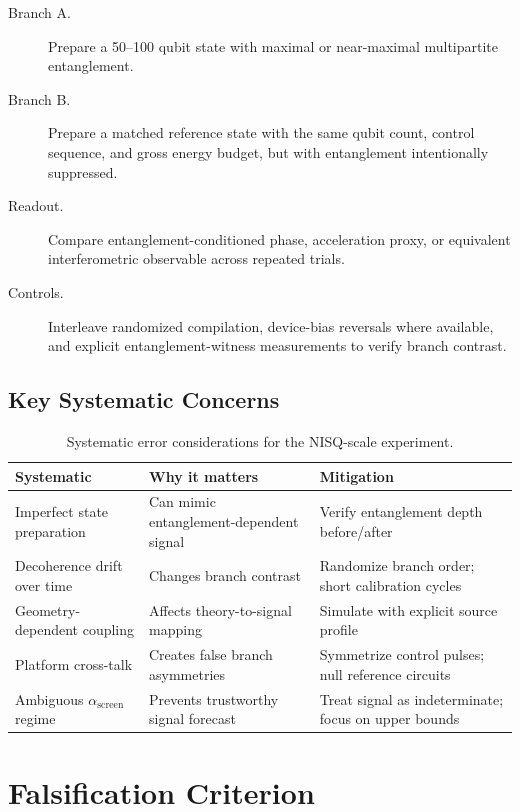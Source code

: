 \documentclass[12pt,letterpaper]{article}
\theoremstyle{plain}
\theoremstyle{definition}
\theoremstyle{remark}
\newcommand{\ascreen}{\alpha_{\mathrm{screen}}}
\begin{document}
\begin{description}
  \item[Branch A.] Prepare a 50--100 qubit state with maximal or
    near-maximal multipartite entanglement.
  \item[Branch B.] Prepare a matched reference state with the same
    qubit count, control sequence, and gross energy budget, but with
    entanglement intentionally suppressed.
  \item[Readout.] Compare entanglement-conditioned phase, acceleration
    proxy, or equivalent interferometric observable across repeated trials.
  \item[Controls.] Interleave randomized compilation, device-bias reversals
    where available, and explicit entanglement-witness measurements to verify
    branch contrast.
\end{description}

\subsection{Key Systematic Concerns}

\begin{table}[H]
\centering
\caption{Systematic error considerations for the NISQ-scale experiment.}
\renewcommand{\arraystretch}{1.25}
\begin{tabular}{@{}p{4.2cm}p{4.2cm}p{4.8cm}@{}}
\toprule
\textbf{Systematic} & \textbf{Why it matters} & \textbf{Mitigation} \\
\midrule
Imperfect state preparation
  & Can mimic entanglement-dependent signal
  & Verify entanglement depth before/after \\
Decoherence drift over time
  & Changes branch contrast
  & Randomize branch order; short calibration cycles \\
Geometry-dependent coupling
  & Affects theory-to-signal mapping
  & Simulate with explicit source profile \\
Platform cross-talk
  & Creates false branch asymmetries
  & Symmetrize control pulses; null reference circuits \\
Ambiguous $\ascreen$ regime
  & Prevents trustworthy signal forecast
  & Treat signal as indeterminate; focus on upper bounds \\
\bottomrule
\end{tabular}
\end{table}

\section{Falsification Criterion}
\label{sec:falsification_A}
\end{document}
